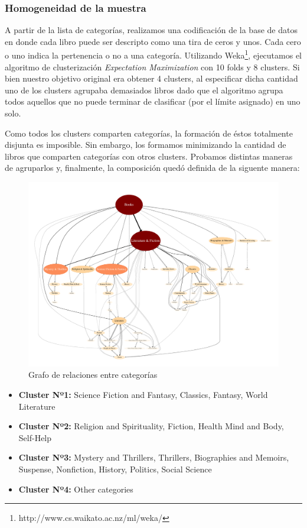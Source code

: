 \documentclass[12pt,journal,compsoc]{IEEEtran}
\begin{document}
\subsubsection{Homogeneidad de la muestra}

A partir de la lista de categorías, realizamos una codificación de la base de datos en donde cada libro puede ser descripto como una tira de ceros y unos. Cada cero o uno indica la pertenencia o no a una categoría. Utilizando Weka\footnote{http://www.cs.waikato.ac.nz/ml/weka/}, ejecutamos el algoritmo de clusterización \textit{Expectation Maximization} con 10 folds y 8 clusters. Si bien nuestro objetivo original era obtener 4 clusters, al especificar dicha cantidad uno de los clusters agrupaba demasiados libros dado que el algoritmo agrupa todos aquellos que no puede terminar de clasificar (por el límite asignado) en uno solo.

Como todos los clusters comparten categorías, la formación de éstos totalmente disjunta es imposible. Sin embargo, los formamos minimizando la cantidad de libros que comparten categorías con otros clusters. Probamos distintas maneras de agruparlos y, finalmente, la composición quedó definida de la siguente manera:

\begin{figure}[H]
  \centering
  \includegraphics[width=7.0in]{../results/graph.pdf}
  \caption{Grafo de relaciones entre categorías}
\end{figure}

\begin{itemize}
\item \textbf{Cluster Nº1:} Science Fiction and Fantasy, Classics, Fantasy, World Literature
\item \textbf{Cluster Nº2:} Religion and Spirituality, Fiction, Health Mind and Body, Self-Help
\item \textbf{Cluster Nº3:} Mystery and Thrillers, Thrillers, Biographies and Memoirs, Suspense, Nonfiction, History, Politics, Social Science
\item \textbf{Cluster Nº4:} Other categories
\end{itemize}
\end{document}
